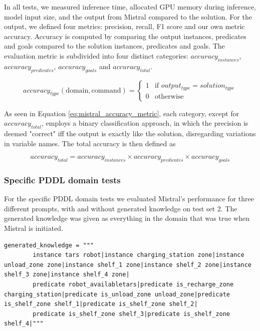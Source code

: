 In all tests, we measured inference time, allocated GPU memory during inference, model input size, and the output from Mistral compared to the solution. For the output, we defined four metrics: precision, recall,
F1 score and our own metric accuracy. Accuracy is computed by comparing the output instances, predicates and goals compared to the solution instances, predicates and goals. The evaluation metric is subdivided
into four distinct categories: $accuracy_{instances}$, $accuracy_{predicates}$, $accuracy_{goals}$ and $accuracy_{total}$.

\begin{equation}\label{eq:mistral_accuracy_metric}
    accuracy_{type}(\text{domain}, \text{command})=
    \begin{cases}
        1 & \text{if } output_{type} = solution_{type} \\
        0 & \text{otherwise}
    \end{cases}
\end{equation}

As seen in Equation \ref{eq:mistral_accuracy_metric}, each category, except for $accuracy_{total}$, employs a binary classification approach, in which the precision is deemed "correct" iff the output is exactly like the solution, disregarding variations in variable names. The total accuracy is then defined as

\begin{equation}\label{eq:mistral_total_accuracy_metric}
    accuracy_{total}=accuracy_{instances}\times accuracy_{predicates}\times accuracy_{goals}
\end{equation}

\subsubsection{Specific PDDL domain tests}
For the specific PDDL domain tests we evaluated Mistral's performance for three different prompts, with and without generated knowledge on test set 2. The generated knowledge was given as everything in the domain
that was true when Mistral is initiated.

\begin{lstlisting}[caption={The generated knowledge available to Mistral at every test run.}, label=lst:generated_knowledge]
    generated_knowledge = """
        instance tars robot|instance charging_station zone|instance unload_zone zone|instance shelf_1 zone|instance shelf_2 zone|instance shelf_3 zone|instance shelf_4 zone|
        predicate robot_availabletars|predicate is_recharge_zone charging_station|predicate is_unload_zone unload_zone|predicate is_shelf_zone shelf_1|predicate is_shelf_zone shelf_2|
        predicate is_shelf_zone shelf_3|predicate is_shelf_zone shelf_4|"""
\end{lstlisting}

